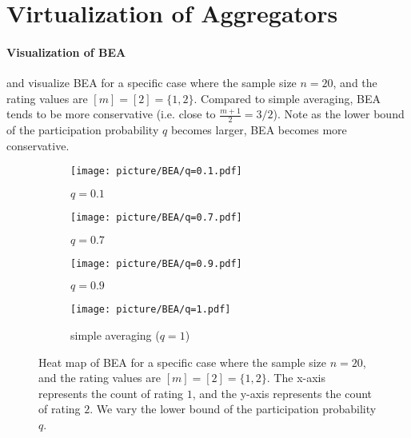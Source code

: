 \section{Virtualization of Aggregators}
\label{sec:vir}

\paragraph{Visualization of BEA}  and  visualize BEA for a specific case where the sample size $n=20$, and the rating values are \([m]=[2]=\{1, 2\}\). Compared to simple averaging, BEA tends to be more conservative (i.e. close to $\frac{m+1}{2}=3/2$). Note as the lower bound of the participation probability $q$ becomes larger, BEA becomes more conservative.


\begin{figure}[h]
  \centering
  \begin{subfigure}[b]{0.23\textwidth}
    \centering
    \texttt{[image: picture/BEA/q=0.1.pdf]}
    \caption{$q=0.1$}
  \end{subfigure}
  \hspace{0.005\textwidth}
  \begin{subfigure}[b]{0.23\textwidth}
    \centering
    \texttt{[image: picture/BEA/q=0.7.pdf]}
    \caption{$q=0.7$}
  \end{subfigure}
  
  \vspace{0.01\textheight} %
  
  \begin{subfigure}[b]{0.23\textwidth}
    \centering
    \texttt{[image: picture/BEA/q=0.9.pdf]} 
     \caption{$q=0.9$}
  \end{subfigure}
  \hspace{0.005\textwidth}
  \begin{subfigure}[b]{0.23\textwidth}
    \centering
    \texttt{[image: picture/BEA/q=1.pdf]}     \caption{simple averaging ($q=1$)}
  \end{subfigure}

  \caption{Heat map of BEA for a specific case where the sample size $n=20$, and the rating values are \([m]=[2]=\{1, 2\}\). The x-axis represents the count of rating \(1\), and the y-axis represents the count of rating \(2\). We vary the lower bound of the participation probability \( q \). }
  \label{fig:BEA_heatmap}
\end{figure}

